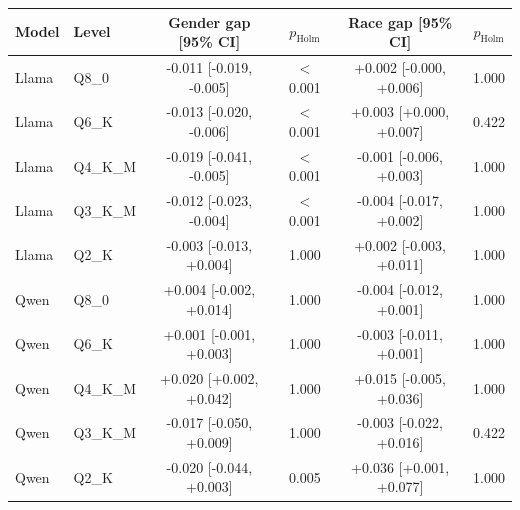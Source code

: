 \begin{tabular}{llcccc}
\toprule
Model & Level & Gender gap [95\% CI] & $p_{\mathrm{Holm}}$ & Race gap [95\% CI] & $p_{\mathrm{Holm}}$ \\
\midrule
Llama & Q8\_0 & -0.011 [-0.019, -0.005] & $<$0.001 & +0.002 [-0.000, +0.006] & 1.000 \\
Llama & Q6\_K & -0.013 [-0.020, -0.006] & $<$0.001 & +0.003 [+0.000, +0.007] & 0.422 \\
Llama & Q4\_K\_M & -0.019 [-0.041, -0.005] & $<$0.001 & -0.001 [-0.006, +0.003] & 1.000 \\
Llama & Q3\_K\_M & -0.012 [-0.023, -0.004] & $<$0.001 & -0.004 [-0.017, +0.002] & 1.000 \\
Llama & Q2\_K & -0.003 [-0.013, +0.004] & 1.000 & +0.002 [-0.003, +0.011] & 1.000 \\
Qwen & Q8\_0 & +0.004 [-0.002, +0.014] & 1.000 & -0.004 [-0.012, +0.001] & 1.000 \\
Qwen & Q6\_K & +0.001 [-0.001, +0.003] & 1.000 & -0.003 [-0.011, +0.001] & 1.000 \\
Qwen & Q4\_K\_M & +0.020 [+0.002, +0.042] & 1.000 & +0.015 [-0.005, +0.036] & 1.000 \\
Qwen & Q3\_K\_M & -0.017 [-0.050, +0.009] & 1.000 & -0.003 [-0.022, +0.016] & 0.422 \\
Qwen & Q2\_K & -0.020 [-0.044, +0.003] & 0.005 & +0.036 [+0.001, +0.077] & 1.000 \\
\bottomrule
\end{tabular}
